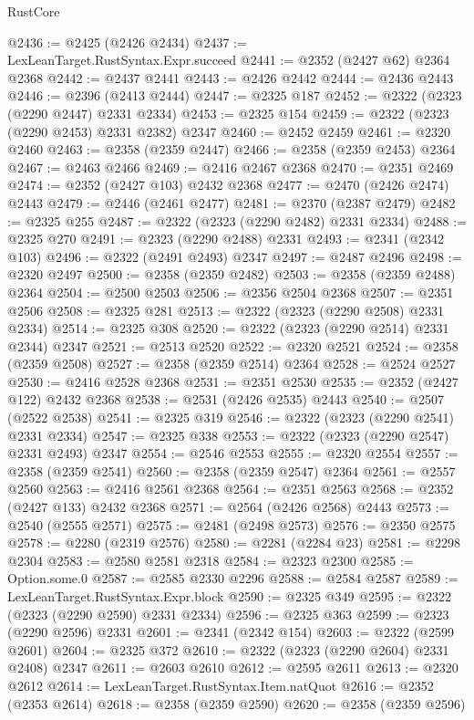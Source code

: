 \begin{lexlean}{RustCore}
\begin{coremodule}
@2436 := @2425 (@2426 @2434)
@2437 := LexLeanTarget.RustSyntax.Expr.succeed
@2441 := @2352 (@2427 @62) @2364 @2368
@2442 := @2437 @2441
@2443 := @2426 @2442
@2444 := @2436 @2443
@2446 := @2396 (@2413 @2444)
@2447 := @2325 @187
@2452 := @2322 (@2323 (@2290 @2447) @2331 @2334)
@2453 := @2325 @154
@2459 := @2322 (@2323 (@2290 @2453) @2331 @2382) @2347
@2460 := @2452 @2459
@2461 := @2320 @2460
@2463 := @2358 (@2359 @2447)
@2466 := @2358 (@2359 @2453) @2364
@2467 := @2463 @2466
@2469 := @2416 @2467 @2368
@2470 := @2351 @2469
@2474 := @2352 (@2427 @103) @2432 @2368
@2477 := @2470 (@2426 @2474) @2443
@2479 := @2446 (@2461 @2477)
@2481 := @2370 (@2387 @2479)
@2482 := @2325 @255
@2487 := @2322 (@2323 (@2290 @2482) @2331 @2334)
@2488 := @2325 @270
@2491 := @2323 (@2290 @2488) @2331
@2493 := @2341 (@2342 @103)
@2496 := @2322 (@2491 @2493) @2347
@2497 := @2487 @2496
@2498 := @2320 @2497
@2500 := @2358 (@2359 @2482)
@2503 := @2358 (@2359 @2488) @2364
@2504 := @2500 @2503
@2506 := @2356 @2504 @2368
@2507 := @2351 @2506
@2508 := @2325 @281
@2513 := @2322 (@2323 (@2290 @2508) @2331 @2334)
@2514 := @2325 @308
@2520 := @2322 (@2323 (@2290 @2514) @2331 @2344) @2347
@2521 := @2513 @2520
@2522 := @2320 @2521
@2524 := @2358 (@2359 @2508)
@2527 := @2358 (@2359 @2514) @2364
@2528 := @2524 @2527
@2530 := @2416 @2528 @2368
@2531 := @2351 @2530
@2535 := @2352 (@2427 @122) @2432 @2368
@2538 := @2531 (@2426 @2535) @2443
@2540 := @2507 (@2522 @2538)
@2541 := @2325 @319
@2546 := @2322 (@2323 (@2290 @2541) @2331 @2334)
@2547 := @2325 @338
@2553 := @2322 (@2323 (@2290 @2547) @2331 @2493) @2347
@2554 := @2546 @2553
@2555 := @2320 @2554
@2557 := @2358 (@2359 @2541)
@2560 := @2358 (@2359 @2547) @2364
@2561 := @2557 @2560
@2563 := @2416 @2561 @2368
@2564 := @2351 @2563
@2568 := @2352 (@2427 @133) @2432 @2368
@2571 := @2564 (@2426 @2568) @2443
@2573 := @2540 (@2555 @2571)
@2575 := @2481 (@2498 @2573)
@2576 := @2350 @2575
@2578 := @2280 (@2319 @2576)
@2580 := @2281 (@2284 @23)
@2581 := @2298 @2304
@2583 := @2580 @2581 @2318
@2584 := @2323 @2300
@2585 := Option.some.{0}
@2587 := @2585 @2330 @2296
@2588 := @2584 @2587
@2589 := LexLeanTarget.RustSyntax.Expr.block
@2590 := @2325 @349
@2595 := @2322 (@2323 (@2290 @2590) @2331 @2334)
@2596 := @2325 @363
@2599 := @2323 (@2290 @2596) @2331
@2601 := @2341 (@2342 @154)
@2603 := @2322 (@2599 @2601)
@2604 := @2325 @372
@2610 := @2322 (@2323 (@2290 @2604) @2331 @2408) @2347
@2611 := @2603 @2610
@2612 := @2595 @2611
@2613 := @2320 @2612
@2614 := LexLeanTarget.RustSyntax.Item.natQuot
@2616 := @2352 (@2353 @2614)
@2618 := @2358 (@2359 @2590)
@2620 := @2358 (@2359 @2596)

\end{coremodule}
\end{lexlean}
